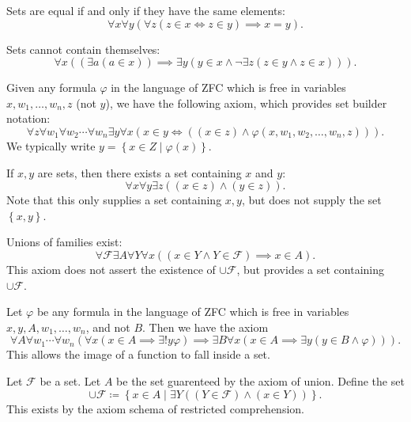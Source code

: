 \begin{axiom}[Extensionality]
	Sets are equal if and only if they have the same elements:
	\[
		\forall x\forall y\left( \forall z\left( z\in x \iff z\in y \right) \implies x=y \right) 
	.\]
\end{axiom}
\begin{axiom}[Regularity]
	Sets cannot contain themselves:
	\[
		\forall x\left( (\exists a(a\in x))\implies \exists y(y\in x \land \neg \exists z(z\in y\land  z\in x)) \right) 
	.\]
\end{axiom}
\begin{axiom}
	Given any formula $\varphi $ in the language of ZFC which is free in variables $x,w_1, \ldots , w_n,z$ (not $y$), we have the following axiom, which provides set builder notation:
	\[
		\forall z\forall w_1 \forall w_2 \cdots \forall w_n \exists y\forall x\left( x\in y \iff ((x\in z) \land \varphi (x, w_1, w_2, \ldots , w_n, z)) \right) 
	.\]
	We typically write $y=\left\{ x\in Z\mid \varphi (x) \right\} $.
\end{axiom}
\begin{axiom}[Pairing]
	If $x,y$ are sets, then there exists a set containing $x$ and $y$:
	\[
		\forall x\forall y\exists z\left( (x\in z)\land (y\in z) \right) 
	.\]
	Note that this only supplies a set containing $x,y$, but does not supply the set $\left\{ x,y \right\} $.
\end{axiom}
\begin{axiom}[Union]
	Unions of families exist:
	\[
		\forall \mathcal{F} \exists A \forall Y\forall x\left( (x\in Y \land Y\in \mathcal{F} ) \implies x\in A \right) 
	.\]
	This axiom does not assert the existence of $\cup \mathcal{F} $, but provides a set containing $\cup \mathcal{F} $.
\end{axiom}
\begin{axiom}
	Let $\varphi $ be any formula in the language of ZFC which is free in variables $x,y,A,w_1, \ldots , w_n$, and not $B$. Then we have the axiom
	\[
		\forall A \forall w_1 \cdots \forall w_n\left( \forall x\left( x\in A \implies \exists !y\varphi  \right) \implies \exists B\forall x\left( x\in A \implies \exists y(y\in B \land \varphi ) \right)  \right) 
	.\]
	This allows the image of a function to fall inside a set.
\end{axiom}
\begin{definition}\label{dfn:union}
	Let $\mathcal{F} $ be a set. Let $A$ be the set guarenteed by the axiom of union. Define the set
	\[
		\cup \mathcal{F} \coloneqq \left\{ x\in A \mid \exists Y((Y\in \mathcal{F} )\land (x\in Y)) \right\} 
	.\]
	This exists by the axiom schema of restricted comprehension.
\end{definition}
